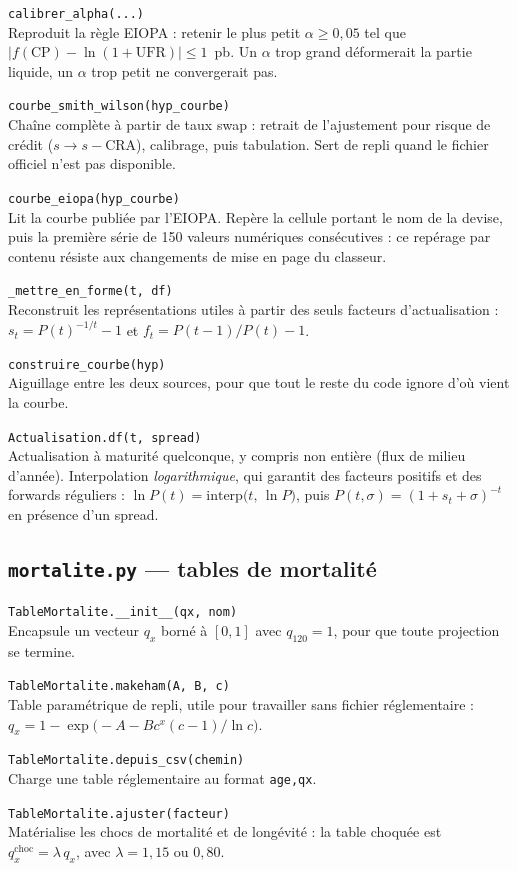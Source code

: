 \documentclass[10pt,a4paper]{article}
\newcommand{\fn}[2]{\par\smallskip\textcolor{bleufonce}{\texttt{#1}}\\ #2\par}
\begin{document}
\fn{calibrer\_alpha(...)}{Reproduit la règle EIOPA : retenir le plus petit $\alpha \ge 0{,}05$
tel que $|f(\mathrm{CP}) - \ln(1+\mathrm{UFR})| \le 1$~pb. Un $\alpha$ trop grand déformerait la
partie liquide, un $\alpha$ trop petit ne convergerait pas.}

\fn{courbe\_smith\_wilson(hyp\_courbe)}{Chaîne complète à partir de taux swap : retrait de
l'ajustement pour risque de crédit ($s \rightarrow s - \mathrm{CRA}$), calibrage, puis
tabulation. Sert de repli quand le fichier officiel n'est pas disponible.}

\fn{courbe\_eiopa(hyp\_courbe)}{Lit la courbe publiée par l'EIOPA. Repère la cellule portant le
nom de la devise, puis la première série de 150 valeurs numériques consécutives : ce repérage
par contenu résiste aux changements de mise en page du classeur.}

\fn{\_mettre\_en\_forme(t, df)}{Reconstruit les représentations utiles à partir des seuls
facteurs d'actualisation : $s_t = P(t)^{-1/t} - 1$ et $f_t = P(t-1)/P(t) - 1$.}

\fn{construire\_courbe(hyp)}{Aiguillage entre les deux sources, pour que tout le reste du code
ignore d'où vient la courbe.}

\fn{Actualisation.df(t, spread)}{Actualisation à maturité quelconque, y compris non entière
(flux de milieu d'année). Interpolation \emph{logarithmique}, qui garantit des facteurs positifs
et des forwards réguliers :
$\ln P(t) = \text{interp}\bigl(t,\, \ln P\bigr)$, puis
$P(t,\sigma) = (1+s_t+\sigma)^{-t}$ en présence d'un spread.}

\subsection{\texttt{mortalite.py} — tables de mortalité}

\fn{TableMortalite.\_\_init\_\_(qx, nom)}{Encapsule un vecteur $q_x$ borné à $[0,1]$ avec
$q_{120}=1$, pour que toute projection se termine.}

\fn{TableMortalite.makeham(A, B, c)}{Table paramétrique de repli, utile pour travailler sans
fichier réglementaire :
$q_x = 1 - \exp\bigl(-A - B c^{x}(c-1)/\ln c\bigr)$.}

\fn{TableMortalite.depuis\_csv(chemin)}{Charge une table réglementaire au format \texttt{age,qx}.}

\fn{TableMortalite.ajuster(facteur)}{Matérialise les chocs de mortalité et de longévité : la
table choquée est $q_x^{\text{choc}} = \lambda\, q_x$, avec $\lambda = 1{,}15$ ou $0{,}80$.}
\end{document}
